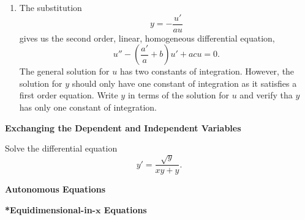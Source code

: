 {\begin{Exercise}
\begin{enumerate}
    What would happen if you continued this method, taking the general solution
    for $y_p$?  Would you be able to find a more general solution?
  \item
    The substitution
    \[
    y = - \frac{u'}{a u}
    \]
    gives us the second order, linear, homogeneous differential equation,
    \[
    u'' - \left( \frac{a'}{a} + b \right) u' + a c u = 0.
    \]
    The general solution for $u$ has two constants of integration.  However, the 
    solution for $y$ should only have one constant of integration as it satisfies
    a first order equation.  Write $y$ in terms of the solution for $u$ and verify
    tha $y$ has only one constant of integration.
  \end{enumerate}

\end{Exercise}






\begin{large}
  \noindent
  \textbf{Exchanging the Dependent and Independent Variables}
\end{large}













\begin{Exercise}
  \label{exercise y'=sqrt y xyy}
  Solve the differential equation
  \[
  y' = \frac{\sqrt{y}}{x y + y}.
  \]

\end{Exercise}



\begin{large}
  \noindent
  \textbf{Autonomous Equations}
\end{large}



\begin{large}
  \noindent
  \textbf{*Equidimensional-in-$\mathbf{x}$ Equations}
\end{large}



}
